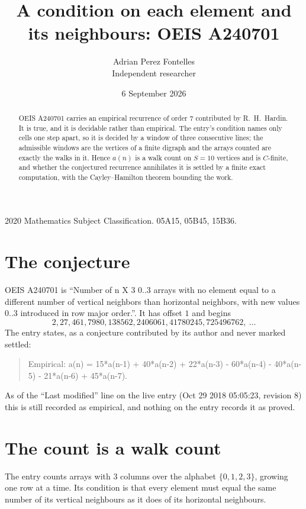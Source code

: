 \documentclass[11pt,a4paper]{article}
\title{A condition on each element and its neighbours: OEIS A240701}
\author{Adrian Perez Fontelles\\ \small Independent researcher}
\date{6 September 2026}
\theoremstyle{plain}
\theoremstyle{definition}
\begin{document}
\maketitle

\begin{abstract}
OEIS A240701 carries an empirical recurrence of order $7$ contributed by R.~H.~Hardin. It is
true, and it is decidable rather than empirical. The entry's condition names only cells one step apart, so it is decided by a window of
three consecutive lines; the
admissible windows are the vertices of a finite digraph and the arrays counted are exactly the
walks in it. Hence $a(n)$ is a walk count on $S=10$ vertices and is $C$-finite, and whether the
conjectured recurrence annihilates it is settled by a finite exact computation, with the
Cayley--Hamilton theorem bounding the work.
\end{abstract}

\noindent\small 2020 Mathematics Subject Classification. 05A15, 05B45, 15B36.\normalsize

\section{The conjecture}

OEIS A240701 is ``Number of n X 3 0..3 arrays with no element equal to a different number of vertical neighbors than horizontal neighbors, with new values 0..3 introduced in row major order.''. It has offset $1$ and begins
\[
2, 27, 461, 7980, 138562, 2406061, 41780245, 725496762,\ \dots
\]
The entry states, as a conjecture contributed by its author and never marked settled:
\begin{quote}
Empirical: a(n) = 15*a(n-1) + 40*a(n-2) + 22*a(n-3) - 60*a(n-4) -  40*a(n-5) - 21*a(n-6) + 45*a(n-7).
\end{quote}
As of the ``Last modified'' line on the live entry (Oct 29 2018 05:05:23, revision 8) this is still
recorded as empirical, and nothing on the entry records it as proved.

\section{The count is a walk count}

The entry counts arrays with $3$ columns over the alphabet $\{0,1,2,3\}$, growing one row at a time. Its condition is that every element must equal the same number of its vertical neighbours as it does of its horizontal neighbours.
\end{document}
